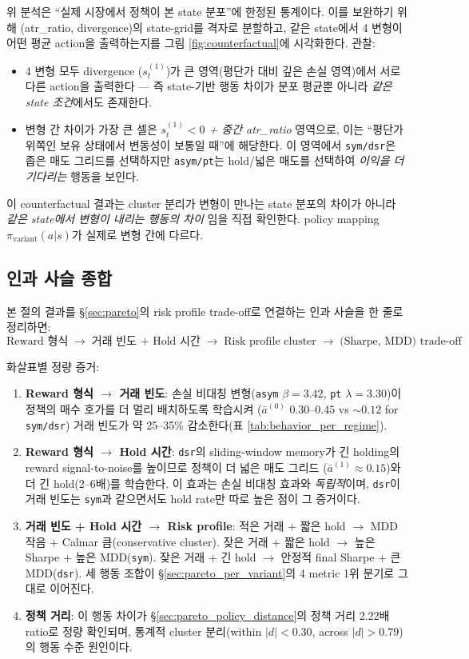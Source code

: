 \documentclass[11pt, a4paper]{article}
\begin{document}
위 분석은 ``실제 시장에서 정책이 본 state 분포''에 한정된 통계이다. 이를 보완하기
위해 (atr\_ratio, divergence)의 state-grid를 격자로 분할하고, 같은 state에서
4 변형이 어떤 평균 action을 출력하는지를 그림 \ref{fig:counterfactual}에 시각화한다.
관찰:
\begin{itemize}[leftmargin=*]
\item 4 변형 모두 divergence ($s_t^{(1)}$)가 큰 영역(평단가 대비 깊은 손실 영역)에서
서로 다른 action을 출력한다 --- 즉 state-기반 행동 차이가 분포 평균뿐 아니라
\emph{같은 state 조건}에서도 존재한다.
\item 변형 간 차이가 가장 큰 셀은 \emph{$s_t^{(1)} < 0$ + 중간 atr\_ratio} 영역으로,
이는 ``평단가 위쪽인 보유 상태에서 변동성이 보통일 때''에 해당한다. 이 영역에서
\texttt{sym/dsr}은 좁은 매도 그리드를 선택하지만 \texttt{asym/pt}는 hold/넓은
매도를 선택하여 \emph{이익을 더 기다리는} 행동을 보인다.
\end{itemize}
이 counterfactual 결과는 cluster 분리가 변형이 만나는 state 분포의 차이가 아니라
\emph{같은 state에서 변형이 내리는 행동의 차이} 임을 직접 확인한다. policy
mapping $\pi_{\text{variant}}(a|s)$가 실제로 변형 간에 다르다.

\subsection{인과 사슬 종합}
\label{sec:mechanism_causal}

본 절의 결과를 \S\ref{sec:pareto}의 risk profile trade-off로 연결하는 인과 사슬을
한 줄로 정리하면:
\[
\boxed{
\text{Reward 형식}
\;\to\;
\text{거래 빈도 + Hold 시간}
\;\to\;
\text{Risk profile cluster}
\;\to\;
\text{(Sharpe, MDD) trade-off}
}
\]

화살표별 정량 증거:

\begin{enumerate}[leftmargin=*]
\item \textbf{Reward 형식 $\to$ 거래 빈도}: 손실 비대칭 변형(\texttt{asym} $\beta=3.42$,
\texttt{pt} $\lambda=3.30$)이 정책의 매수 호가를 더 멀리 배치하도록 학습시켜
($\bar{a}^{(0)}$ $0.30$--$0.45$ vs $\sim 0.12$ for \texttt{sym/dsr}) 거래 빈도가
약 25--35\% 감소한다(표 \ref{tab:behavior_per_regime}).
\item \textbf{Reward 형식 $\to$ Hold 시간}: \texttt{dsr}의 sliding-window memory가
긴 holding의 reward signal-to-noise를 높이므로 정책이 더 넓은 매도 그리드
($\bar{a}^{(1)} \approx 0.15$)와 더 긴 hold(2--6배)를 학습한다. 이 효과는 손실
비대칭 효과와 \emph{독립적}이며, \texttt{dsr}이 거래 빈도는 \texttt{sym}과 같으면서도
hold rate만 따로 높은 점이 그 증거이다.
\item \textbf{거래 빈도 + Hold 시간 $\to$ Risk profile}: 적은 거래 + 짧은 hold
$\to$ MDD 작음 + Calmar 큼(conservative cluster). 잦은 거래 + 짧은 hold $\to$
높은 Sharpe + 높은 MDD(\texttt{sym}). 잦은 거래 + 긴 hold $\to$ 안정적 final
Sharpe + 큰 MDD(\texttt{dsr}). 세 행동 조합이 \S\ref{sec:pareto_per_variant}의
4 metric 1위 분기로 그대로 이어진다.
\item \textbf{정책 거리}: 이 행동 차이가 \S\ref{sec:pareto_policy_distance}의
정책 거리 2.22배 ratio로 정량 확인되며, 통계적 cluster 분리(within $|d|<0.30$,
across $|d|>0.79$)의 행동 수준 원인이다.
\end{enumerate}
\end{document}
